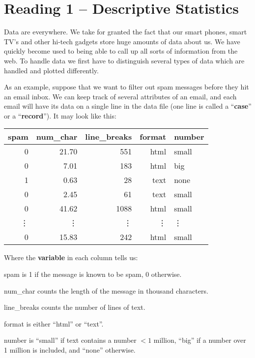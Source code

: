 \def\theTopic{Reading 1}

\section{Reading 1 -- Descriptive Statistics}


Data are everywhere.  We take for granted the fact that our smart
phones, smart TV's and other hi-tech gadgets store
huge amounts of data about us.  We have quickly become used to being
able to call up all sorts of information from the web. 
To handle data we first have to distinguish several types of data
which are handled and plotted differently.

As an example, suppose that we want to filter out spam messages before
they hit an email inbox.  We can keep track of several attributes
of an email, and each email will have its data on a single line in the
data file (one line is  called a ``{\bf case}'' or a  ``{\bf record}''). It
may look like this:

\begin{table}[ht]
\centering
\begin{tabular}{rrrrl}
  \hline
 spam & num\_char & line\_breaks & format & number \\ 
  \hline
   0 & 21.70 & 551 &html& small \\ 
   0 & 7.01 & 183 &html& big \\ 
   1 & 0.63 &  28 &text& none \\ 
   0 & 2.45 &  61 &text& small \\ 
   0 & 41.62 & 1088 &html& small \\ 
 \vdots&\vdots&\vdots&\vdots&\vdots\\
   0 & 15.83 & 242 &html& small \\ 
   \hline
\end{tabular}
\end{table}

Where the {\bf variable} in each column tells us:\vspace{-.8cm}
\begin{list}{}{}
  \item [spam] is 1 if the message is known to be spam, 0 otherwise.
  \item [num\_char] counts the length of the message in thousand characters.
  \item [line\_breaks] counts the number of lines of text.
  \item [format] is either ``html'' or ``text''.
  \item [number] is ``small'' if text contains a number $< 1 $ million,
    ``big'' if a number over 1 million is included, and ``none'' otherwise. 
\end{list}

